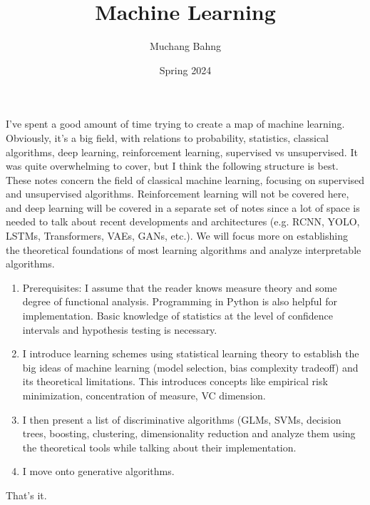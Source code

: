 \documentclass{article}
\theoremstyle{definition}
\begin{document}
\pagestyle{fancy}

\cfoot{\thepage / \pageref{LastPage}}

\title{Machine Learning}
\author{Muchang Bahng}
\date{Spring 2024}

\maketitle
\tableofcontents
\pagebreak 

I've spent a good amount of time trying to create a map of machine learning. Obviously, it's a big field, with relations to probability, statistics, classical algorithms, deep learning, reinforcement learning, supervised vs unsupervised. It was quite overwhelming to cover, but I think the following structure is best. These notes concern the field of classical machine learning, focusing on supervised and unsupervised algorithms. Reinforcement learning will not be covered here, and deep learning will be covered in a separate set of notes since a lot of space is needed to talk about recent developments and architectures (e.g. RCNN, YOLO, LSTMs, Transformers, VAEs, GANs, etc.). We will focus more on establishing the theoretical foundations of most learning algorithms and analyze interpretable algorithms. 

\begin{enumerate}
  \item Prerequisites: I assume that the reader knows measure theory and some degree of functional analysis. Programming in Python is also helpful for implementation. Basic knowledge of statistics at the level of confidence intervals and hypothesis testing is necessary. 
  \item I introduce learning schemes using statistical learning theory to establish the big ideas of machine learning (model selection, bias complexity tradeoff) and its theoretical limitations. This introduces concepts like empirical risk minimization, concentration of measure, VC dimension. 
  \item I then present a list of discriminative algorithms (GLMs, SVMs, decision trees, boosting, clustering, dimensionality reduction and analyze them using the theoretical tools while talking about their implementation. 
  \item I move onto generative algorithms. 
\end{enumerate}

That's it. 
\end{document}
